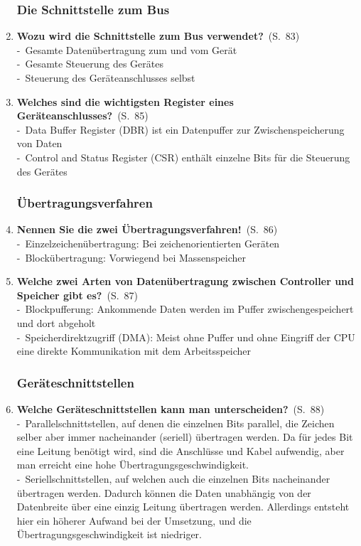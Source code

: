 \documentclass[a4paper,12pt]{article}
\newcommand{\question}[3]{\pagebreak[3]\item {\textbf{#1?}}\ (S.\ #2)#3}
\newcommand{\statement}[3]{\pagebreak[3]\item {\textbf{#1!}}\ (S.\ #2)#3}
\newcommand{\catchword}[1]{\\-\ #1}
\newcommand{\page}[1]{#1}
\begin{document}
\begin{enumerate}
  \subsubsection{Die Schnittstelle zum Bus}

  \question{Wozu wird die Schnittstelle zum Bus verwendet}{\page{83}}
  {
    \catchword{Gesamte Datenübertragung zum und vom Gerät}
    \catchword{Gesamte Steuerung des Gerätes}
    \catchword{Steuerung des Geräteanschlusses selbst}
  }

  \question{Welches sind die wichtigsten Register eines Geräteanschlusses}{\page{85}}
  {
    \catchword{Data Buffer Register (DBR) ist ein Datenpuffer zur Zwischenspeicherung von Daten}
    \catchword{Control and Status Register (CSR) enthält einzelne Bits für die Steuerung des Gerätes}
  }

  \subsubsection{Übertragungsverfahren}

  \statement{Nennen Sie die zwei Übertragungsverfahren}{\page{86}}
  {
    \catchword{Einzelzeichenübertragung: Bei zeichenorientierten Geräten}
    \catchword{Blockübertragung: Vorwiegend bei Massenspeicher}
  }

  \question{Welche zwei Arten von Datenübertragung zwischen Controller und Speicher gibt es}{\page{87}}
  {
    \catchword{Blockpufferung: Ankommende Daten werden im Puffer zwischengespeichert und dort abgeholt}
    \catchword{Speicherdirektzugriff (DMA): Meist ohne Puffer und ohne Eingriff der CPU eine
               direkte Kommunikation mit dem Arbeitsspeicher}
  }

  \subsubsection{Geräteschnittstellen}

  \question{Welche Geräteschnittstellen kann man unterscheiden}{\page{88}}
  {
    \catchword{Parallelschnittstellen, auf denen die einzelnen Bits parallel, die Zeichen selber 
               aber immer nacheinander (seriell) übertragen werden. Da für jedes Bit eine Leitung benötigt 
               wird, sind die Anschlüsse und Kabel aufwendig, aber man erreicht eine hohe
               Übertragungsgeschwindigkeit.}
    \catchword{Seriellschnittstellen, auf welchen auch die einzelnen Bits nacheinander übertragen werden. 
               Dadurch können die Daten unabhängig von der Datenbreite über eine einzig Leitung
               übertragen werden. Allerdings entsteht hier ein höherer Aufwand bei der Umsetzung, und 
               die Übertragungsgeschwindigkeit ist niedriger.}
  }


\end{enumerate}
\end{document}
